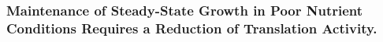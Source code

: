 \subsubsection{Maintenance of Steady-State Growth in Poor Nutrient Conditions  Requires
a Reduction of Translation Activity.}
%
%
%
%
%
%
%
%
%
%
%
%
%
%
%
%
%
